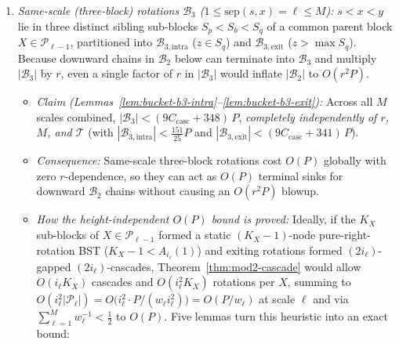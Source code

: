 \documentclass[11pt]{article}
\theoremstyle{definition}
\theoremstyle{remark}
\newcommand{\sep}{\mathrm{sep}}
\begin{document}
\begin{enumerate}[label=(\arabic*), leftmargin=2em, itemsep=2pt]
\begin{itemize}[leftmargin=1.5em, itemsep=1pt]
    \item \emph{Consequence:} Because strict ancestor chains in $\mathcal{T}$ visit at most $r$ internal nodes before terminating at a sink in $\mathcal{S}_1 \sqcup \mathcal{B}_{\mathrm{leaf,pre}}$, we obtain $|\mathcal{B}_1| \le r(|\mathcal{S}_1| + |\mathcal{B}_{\mathrm{leaf,pre}}|) < 3 r P$. Moreover, because every directed chain through $\mathcal{B}_1 \setminus \mathcal{S}_1$ ends at a distinct sink in $\mathcal{S}_1 \sqcup \mathcal{B}_{\mathrm{leaf,pre}}$, the set $\mathcal{E}_{\mathrm{enter}}$ of rotations outside $\mathcal{B}_1 \setminus \mathcal{S}_1$ whose next rotation $e^+$ enters $\mathcal{B}_1 \sqcup \mathcal{B}_{\mathrm{leaf,pre}}$ satisfies $|\mathcal{E}_{\mathrm{enter}}| \le |\mathcal{S}_1| + |\mathcal{B}_{\mathrm{leaf,pre}}| < \frac{51}{25} P$, \emph{independently of $r$ and $M$}.
  \end{itemize}
  \item \emph{Same-scale (three-block) rotations $\mathcal{B}_3$ ($1 \le \sep(s, x) = \ell \le M$):} $s < x < y$ lie in three distinct sibling sub-blocks $S_p < S_b < S_q$ of a common parent block $X \in \mathcal{P}_{\ell-1}$, partitioned into $\mathcal{B}_{3,\mathrm{intra}}$ ($z \in S_q$) and $\mathcal{B}_{3,\mathrm{exit}}$ ($z > \max S_q$). Because downward chains in $\mathcal{B}_2$ below can terminate into $\mathcal{B}_3$ and multiply $|\mathcal{B}_3|$ by $r$, even a single factor of $r$ in $|\mathcal{B}_3|$ would inflate $|\mathcal{B}_2|$ to $O(r^2 P)$.
  \begin{itemize}[leftmargin=1.5em, itemsep=1pt]
    \item \emph{Claim (Lemmas~\ref{lem:bucket-b3-intra}--\ref{lem:bucket-b3-exit}):} Across all $M$ scales combined, $|\mathcal{B}_3| < (9 C_{\mathrm{casc}} + 348)\,P$, \emph{completely independently of $r$, $M$, and $\mathcal{T}$} (with $|\mathcal{B}_{3,\mathrm{intra}}| < \frac{151}{25} P$ and $|\mathcal{B}_{3,\mathrm{exit}}| < (9 C_{\mathrm{casc}} + 341)\,P$).
    \item \emph{Consequence:} Same-scale three-block rotations cost $O(P)$ globally with zero $r$-dependence, so they can act as $O(P)$ terminal sinks for downward $\mathcal{B}_2$ chains without causing an $O(r^2 P)$ blowup.
    \item \emph{How the height-independent $O(P)$ bound is proved:} Ideally, if the $K_X$ sub-blocks of $X \in \mathcal{P}_{\ell-1}$ formed a static $(K_X - 1)$-node pure-right-rotation BST ($K_X - 1 < A_{i_\ell}(1)$) and exiting rotations formed $(2 i_\ell)$-gapped $(2 i_\ell)$-cascades, Theorem~\ref{thm:mod2-cascade} would allow $O(i_\ell K_X)$ cascades and $O(i_\ell^2 K_X)$ rotations per $X$, summing to $O(i_\ell^2 |\mathcal{P}_\ell|) = O\big(i_\ell^2 \cdot P / (w_\ell i_\ell^2)\big) = O(P / w_\ell)$ at scale $\ell$ and via $\sum_{\ell=1}^M w_\ell^{-1} < \frac{1}{2}$ to $O(P)$. Five lemmas turn this heuristic into an exact bound:

\end{itemize}
\end{enumerate}
\end{document}
